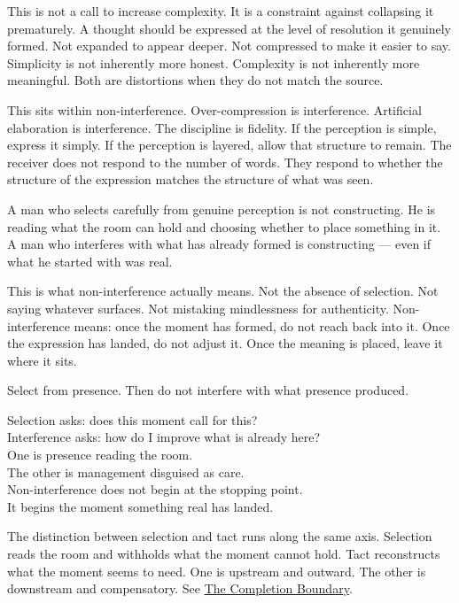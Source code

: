 This is not a call to increase complexity.
It is a constraint against collapsing it prematurely.
A thought should be expressed at the level of resolution it genuinely formed.
Not expanded to appear deeper.
Not compressed to make it easier to say.
Simplicity is not inherently more honest. Complexity is not inherently more meaningful. 
Both are distortions when they do not match the source.

This sits within non-interference.
Over-compression is interference.
Artificial elaboration is interference.
The discipline is fidelity.
If the perception is simple, express it simply.
If the perception is layered, allow that structure to remain.
The receiver does not respond to the number of words.
They respond to whether the structure of the expression matches the structure of what was seen.

A man who selects carefully from genuine perception is not constructing. 
He is reading what the room can hold and choosing whether to place 
something in it. A man who interferes with what has already formed 
is constructing --- even if what he started with was real.

This is what non-interference actually means. Not the absence of 
selection. Not saying whatever surfaces. Not mistaking mindlessness 
for authenticity. Non-interference means: once the moment has formed, 
do not reach back into it. Once the expression has landed, do not 
adjust it. Once the meaning is placed, leave it where it sits.

Select from presence. Then do not interfere with what presence produced.

\begin{calloutbox}
Selection asks: does this moment call for this?\\
Interference asks: how do I improve what is already here?\\[0.4em]
One is presence reading the room.\\
The other is management disguised as care.\\[0.4em]
Non-interference does not begin at the stopping point.\\
It begins the moment something real has landed.
\end{calloutbox}

The distinction between selection and tact runs along the same axis.
Selection reads the room and withholds what the moment cannot hold.
Tact reconstructs what the moment seems to need. One is upstream and
outward. The other is downstream and compensatory. See
\hyperref[subsec:completion_boundary]{The Completion Boundary}.

